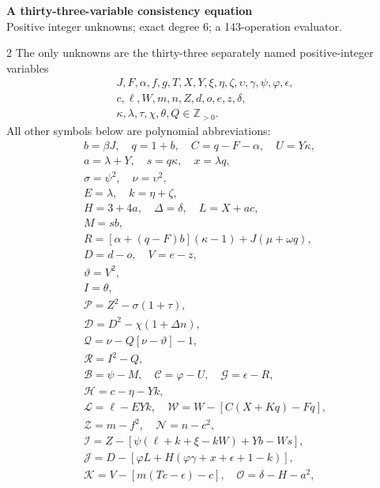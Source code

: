 \documentclass[10pt]{article}
\begin{document}
\begin{center}
{\large\bfseries A thirty-three-variable consistency equation}\\[-1pt]
{\small Positive integer unknowns; exact degree 6; a 143-operation evaluator.}
\end{center}\vspace{-8pt}
\begin{multicols}{2}
\fontsize{8.6}{9.1}\selectfont
The only unknowns are the thirty-three separately named positive-integer variables
\[
\begin{gathered}J,F,\alpha,f,g,T,X,Y,\xi,\eta,\zeta,\upsilon,\gamma,\psi,\varphi,\epsilon,\\
c,\ell,W,m,n,Z,d,o,e,z,\delta,\\
\kappa,\lambda,\tau,\chi,\theta,Q\in\mathbb Z_{>0}.\end{gathered}
\]
All other symbols below are polynomial abbreviations:
\[
\begin{gathered}
b=\beta J,\quad q=1+b,\quad C=q-F-\alpha,\quad U=Y\kappa,\\
a=\lambda+Y,\quad s=q\kappa,\quad x=\lambda q,\\
\sigma=\psi^2,\quad\nu=\upsilon^2,\\
E=\lambda,\quad k=\eta+\zeta,\\
H=3+4a,\quad\Delta=\delta,\quad L=X+ac,\\
M=sb,\\
R=[\alpha+(q-F)b](\kappa-1)+J(\mu+\omega q),\\
D=d-o,\quad V=e-z,\\
\vartheta=V^2,\\
I=\theta,\\
\mathcal{P}=Z^2-\sigma(1+\tau),\\
\mathcal{D}=D^2-\chi(1+\Delta n),\\
\mathcal{Q}=\nu-Q[\nu-\vartheta]-1,\\
\mathcal{R}=I^2-Q,\\
\mathcal{B}=\psi-M,\quad \mathcal{C}=\varphi-U,\quad \mathcal{G}=\epsilon-R,\\
\mathcal{H}=c-\eta-Yk,\\
\mathcal{L}=\ell-EYk,\quad \mathcal{W}=W-[C(X+Kq)-Fq],\\
\mathcal{Z}=m-f^2,\quad \mathcal{N}=n-c^2,\\
\mathcal{I}=Z-[\psi(\ell+k+\xi-kW)+Yb-Ws],\\
\mathcal{J}=D-[\varphi L+H(\varphi\gamma+x+\epsilon+1-k)],\\
\mathcal{K}=V-[m(Tc-\epsilon)-c],\quad\mathcal{O}=\delta-H-a^2,\\

\end{gathered}\]
\end{multicols}
\end{document}

